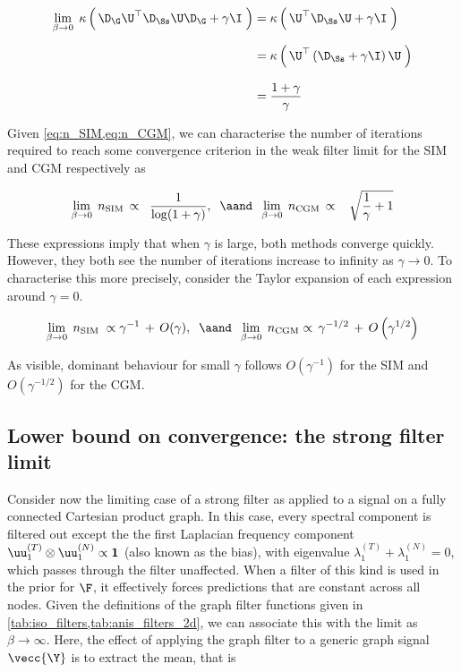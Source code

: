 \begin{align}
    \lim_{\beta \rightarrow 0} \; \kappa \left(  \, \D_\G \U^\top \D_{\Ss} \U \D_\G + \gamma \I \; \right) &= \kappa  \left(  \, \U^\top \D_{\Ss} \U + \gamma \I \; \right) \notag \\[0.2cm]
    &= \kappa  \left(  \, \U^\top \left( \D_{\Ss} + \gamma \I \right) \U \; \right) \notag \\[0.3cm]
    &= \frac{1 + \gamma}{\gamma}
\end{align}

 Given \cref{eq:n_SIM,eq:n_CGM}, we can characterise the number of iterations required to reach some convergence criterion in the weak filter limit for the SIM and CGM respectively as

 \begin{equation}
    \label{eq:n_WFL}
    \lim_{\beta \rightarrow 0} \;  n_\text{SIM} \, \propto \;\;  \frac{1}{\log(1 + \gamma)}, \;\;  \aand  \;\; \lim_{\beta \rightarrow 0} \;  n_\text{CGM} \, \propto \;\;\;  \sqrt{\frac{1}{\gamma} + 1}
 \end{equation}

These expressions imply that when $\gamma$ is large, both methods converge quickly. However, they both see the number of iterations increase to infinity as $\gamma \rightarrow 0$. To characterise this more precisely, consider the Taylor expansion of each expression around $\gamma = 0$.  

\begin{equation}
    \lim_{\beta \rightarrow 0} \;  n_\text{SIM}  \;  \propto \gamma^{-1} \, + \, O(\gamma), \;\; \aand \;\; \lim_{\beta \rightarrow 0} \;  n_\text{CGM} \propto \, \gamma^{-1/2} \, + \, O\left(\gamma^{1/2}\right) 
\end{equation}


As visible, dominant behaviour for small $\gamma$ follows $O(\gamma^{-1})$ for the SIM and $O(\gamma^{-1/2})$ for the CGM.

\subsection{Lower bound on convergence: the strong filter limit}

Consider now the limiting case of a strong filter as applied to a signal on a fully connected Cartesian product graph. In this case, every spectral component is filtered out except the the first Laplacian frequency component $\uu_1^{(T)} \otimes \uu_1^{(N)}   \propto \mathbf{1}$ (also known as the bias), with eigenvalue $\lambda_1^{(T)} + \lambda_1^{(N)} = 0$, which passes through the filter unaffected. When a filter of this kind is used in the prior for $\F$, it effectively forces predictions that are constant across all nodes. Given the definitions of the graph filter functions given in \cref{tab:iso_filters,tab:anis_filters_2d}, we can associate this with the limit as $\beta \rightarrow \infty$. Here, the effect of applying the graph filter to a generic graph signal $\vecc{\Y}$ is to extract the mean, that is 

